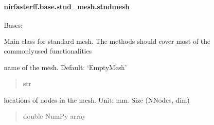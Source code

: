 \documentclass[letterpaper,10pt,english]{sphinxmanual}
\begin{document}
\sphinxstepscope


\paragraph{nirfasterff.base.stnd\_mesh.stndmesh}
\label{\detokenize{_autosummary/nirfasterff.base.stnd_mesh.stndmesh:nirfasterff-base-stnd-mesh-stndmesh}}\label{\detokenize{_autosummary/nirfasterff.base.stnd_mesh.stndmesh::doc}}

\begin{fulllineitems}
\label{\detokenize{_autosummary/nirfasterff.base.stnd_mesh.stndmesh:nirfasterff.base.stnd_mesh.stndmesh}}
\pysigstartsignatures
\pysigline
{}
\pysigstopsignatures
\sphinxAtStartPar
Bases: {\hyperref[\detokenize{_autosummary/nirfasterff.base.mesh.mesh:nirfasterff.base.mesh.mesh}]{}}

\sphinxAtStartPar
Main class for standard mesh. The methods should cover most of the commonly\sphinxhyphen{}used functionalities

\begin{fulllineitems}
\label{\detokenize{_autosummary/nirfasterff.base.stnd_mesh.stndmesh:nirfasterff.base.stnd_mesh.stndmesh.name}}
\pysigstartsignatures
\pysigline
{}
\pysigstopsignatures
\sphinxAtStartPar
name of the mesh. Default: ‘EmptyMesh’
\begin{quote}\begin{description}
\sphinxAtStartPar
str

\end{description}\end{quote}

\end{fulllineitems}


\begin{fulllineitems}
\label{\detokenize{_autosummary/nirfasterff.base.stnd_mesh.stndmesh:nirfasterff.base.stnd_mesh.stndmesh.nodes}}
\pysigstartsignatures
\pysigline
{}
\pysigstopsignatures
\sphinxAtStartPar
locations of nodes in the mesh. Unit: mm. Size (NNodes, dim)
\begin{quote}\begin{description}
\sphinxAtStartPar
double NumPy array


\end{description}
\end{quote}
\end{fulllineitems}
\end{fulllineitems}
\end{document}
